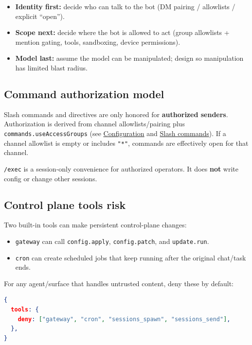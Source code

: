 \begin{itemize}
  \item \textbf{Identity first:} decide who can talk to the bot (DM pairing / allowlists / explicit “open”).
  \item \textbf{Scope next:} decide where the bot is allowed to act (group allowlists + mention gating, tools, sandboxing, device permissions).
  \item \textbf{Model last:} assume the model can be manipulated; design so manipulation has limited blast radius.
\end{itemize}


\subsection{Command authorization model}


Slash commands and directives are only honored for \textbf{authorized senders}. Authorization is derived from
channel allowlists/pairing plus \texttt{commands.useAccessGroups} (see \href{/gateway/configuration}{Configuration}
and \href{/tools/slash-commands}{Slash commands}). If a channel allowlist is empty or includes \texttt{"*"},
commands are effectively open for that channel.

\texttt{/exec} is a session-only convenience for authorized operators. It does \textbf{not} write config or
change other sessions.

\subsection{Control plane tools risk}


Two built-in tools can make persistent control-plane changes:

\begin{itemize}
  \item \texttt{gateway} can call \texttt{config.apply}, \texttt{config.patch}, and \texttt{update.run}.
  \item \texttt{cron} can create scheduled jobs that keep running after the original chat/task ends.
\end{itemize}


For any agent/surface that handles untrusted content, deny these by default:

\begin{lstlisting}[language=json]
{
  tools: {
    deny: ["gateway", "cron", "sessions_spawn", "sessions_send"],
  },
}
\end{lstlisting}


